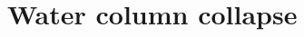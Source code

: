 % 
% 
% 
% 
% 
% 
% 
% 
% 
% 
% 
% 
% 
% 
% 
% 
% 
% 
% 

\section{Water column collapse}
\label{sec:water_collapse}

